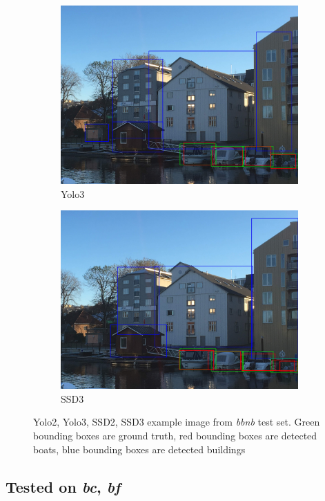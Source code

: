 \begin{figure}[h!]
\begin{subfigure}{.5\textwidth}
  \centering
  \includegraphics[width=0.8\linewidth]{results/case_buildings/prec_recall/yolo/IMG_2077_build.jpg}
  \caption{Yolo3}
  \label{fig:ex_bbnb_yolo3}
\end{subfigure}%
\begin{subfigure}{.5\textwidth}
  \centering
  \includegraphics[width=.8\linewidth]{results/case_buildings/prec_recall/ssd/IMG_2077_build.jpg}
  \caption{SSD3}
  \label{fig:ex_bbnb_ssd3}
\end{subfigure}
\caption{Yolo2, Yolo3, SSD2, SSD3 example image from \textit{bbnb} test set. Green bounding boxes are ground truth, red bounding boxes are detected boats, blue bounding boxes are detected buildings}
\label{img:bbnb_ex}
\end{figure}

\newpage

\subsection{Tested on \textit{bc}, \textit{bf}}


